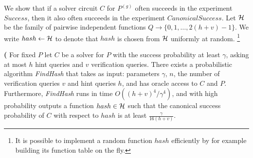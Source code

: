 We show that if a solver circuit $C$ for $P^{(g)}$ often succeeds in the experiment $Success$, then it
also often succeeds in the experiment $CanonicalSuccess$.
Let $\mathcal{H}$ be the family of pairwise independent functions $Q \rightarrow \{0,1, \dots,2(h+v)-1\}$.
We write $hash \leftarrow \mathcal{H}$ to denote that $hash$ is chosen from $\mathcal{H}$ uniformly at random.
\footnote{It is possible to implement a random function $hash$ efficiently by for example building its function table on the fly.}
%
%
\begin{lemma}\textbf{(}
\label{lemma:hash_function_probability}
For fixed $P$ let $C$ be a solver for $P$ with the success probability at least $\gamma$,
asking at most $h$ hint queries and $v$ verification queries.
There exists a probabilistic algorithm \textit{FindHash} that takes as input:
parameters $\gamma$, $n$, the number of verification queries $v$ and hint queries $h$, and has
oracle access to $C$ and $P$. Furthermore, \textit{FindHash} runs in time $O((h+v)^4/\gamma^4)$,
and with high probability outputs a function $hash \in \mathcal{H}$
such that the canonical success probability of $C$ with respect to $hash$ is at least $\frac{\gamma}{16(h+v)}$.
\end{lemma}
%
